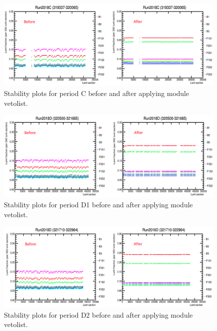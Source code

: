 \begin{figure}[!htp]
\centering
\includegraphics[width=1\textwidth]{ashish_thesis/Run2018C_before_after_stability.png}
\caption{%
   Stability plots for period C before and after applying module vetolist.
}
\label{fig:stability_C}
\end{figure}


\begin{figure}[!htp]
\centering
\includegraphics[width=1\textwidth]{ashish_thesis/Run2018D1_before_after_stability.png}
\caption{%
   Stability plots for period D1 before and after applying module vetolist.
}
\label{fig:stability_D1}
\end{figure}


\begin{figure}[!htp]
\centering
\includegraphics[width=1\textwidth]{ashish_thesis/Run2018D2_before_after_stability.png}
\caption{%
   Stability plots for period D2 before and after applying module vetolist.
}
\label{fig:stability_D2}
\end{figure}


